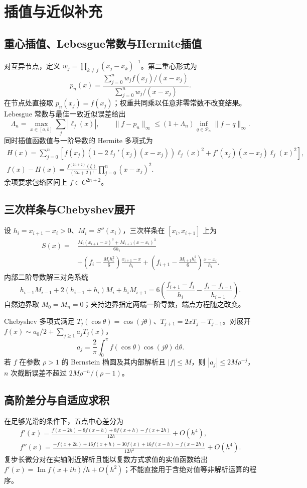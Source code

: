 \documentclass[../main.tex]{subfiles}
\begin{document}
\section{插值与近似补充}
\subsection{重心插值、Lebesgue常数与Hermite插值}
对互异节点，定义 $w_j=\prod_{k\ne j}(x_j-x_k)^{-1}$。第二重心形式为
\[
p_n(x)=\frac{\sum_{j=0}^n w_jf(x_j)/(x-x_j)}{\sum_{j=0}^n w_j/(x-x_j)}.
\]
在节点处直接取 $p_n(x_j)=f(x_j)$；权重共同乘以任意非零常数不改变结果。Lebesgue 常数与最佳一致近似误差给出
\[
\Lambda_n=\max_{x\in[a,b]}\sum_j|\ell_j(x)|,\qquad
\|f-p_n\|_\infty\le(1+\Lambda_n)\inf_{q\in\mathcal P_n}\|f-q\|_\infty.
\]
同时插值函数值与一阶导数的 Hermite 多项式为
\begin{gather*}
H(x)=\sum_{j=0}^n\left[f(x_j)(1-2\ell_j'(x_j)(x-x_j))\ell_j(x)^2
+f'(x_j)(x-x_j)\ell_j(x)^2\right],\\
f(x)-H(x)=\frac{f^{(2n+2)}(\xi)}{(2n+2)!}\prod_{j=0}^n(x-x_j)^2.
\end{gather*}
余项要求包络区间上 $f\in C^{2n+2}$。

\subsection{三次样条与Chebyshev展开}
设 $h_i=x_{i+1}-x_i>0$、$M_i=S''(x_i)$，三次样条在 $[x_i,x_{i+1}]$ 上为
\begin{align*}
S(x)={}&\frac{M_i(x_{i+1}-x)^3+M_{i+1}(x-x_i)^3}{6h_i}\\
&+\left(f_i-\frac{M_ih_i^2}{6}\right)\frac{x_{i+1}-x}{h_i}
+\left(f_{i+1}-\frac{M_{i+1}h_i^2}{6}\right)\frac{x-x_i}{h_i}.
\end{align*}
内部二阶导数解三对角系统
\[
h_{i-1}M_{i-1}+2(h_{i-1}+h_i)M_i+h_iM_{i+1}
=6\left(\frac{f_{i+1}-f_i}{h_i}-\frac{f_i-f_{i-1}}{h_{i-1}}\right).
\]
自然边界取 $M_0=M_n=0$；夹持边界指定两端一阶导数，端点方程随之改变。

Chebyshev 多项式满足 $T_j(\cos\theta)=\cos(j\theta)$、$T_{j+1}=2xT_j-T_{j-1}$。对展开 $f(x)\sim a_0/2+\sum_{j\ge1}a_jT_j(x)$，
\[
a_j=\frac2\pi\int_0^\pi f(\cos\theta)\cos(j\theta)\,\mathrm d\theta.
\]
若 $f$ 在参数 $\rho>1$ 的 Bernstein 椭圆及其内部解析且 $|f|\le M$，则 $|a_j|\le2M\rho^{-j}$，$n$ 次截断误差不超过 $2M\rho^{-n}/(\rho-1)$。

\subsection{高阶差分与自适应求积}
在足够光滑的条件下，五点中心差分为
\begin{gather*}
f'(x)=\frac{f(x-2h)-8f(x-h)+8f(x+h)-f(x+2h)}{12h}+O(h^4),\\
f''(x)=\frac{-f(x+2h)+16f(x+h)-30f(x)+16f(x-h)-f(x-2h)}{12h^2}+O(h^4).
\end{gather*}
复步长微分对在实轴附近解析且能以复数方式求值的实值函数给出 $f'(x)=\operatorname{Im}f(x+ih)/h+O(h^2)$；不能直接用于含绝对值等非解析运算的程序。
\end{document}
